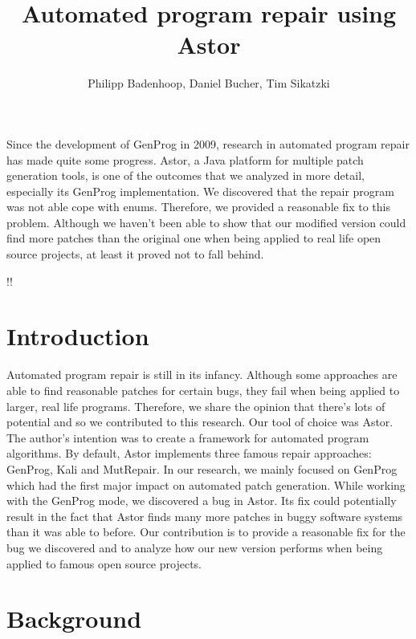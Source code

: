 \documentclass[pdftex,english,oribibl]{llncs}
\title{Automated program repair using Astor}
\author{Philipp Badenhoop, Daniel Bucher, Tim Sikatzki}
\institute{Humboldt University of Berlin\\Department of Computer Science\\12489 Berlin, Germany}
\makeatletter
\gdef\@keywords{}
\renewenvironment{abstract}{%
  \list{}{\advance\topsep by0.35cm\relax\small%
          \leftmargin=1cm%
          \labelwidth=\z@%
          \listparindent=\z@%
          \itemindent\listparindent%
          \rightmargin\leftmargin}%
          \item[\hskip\labelsep\bfseries\abstractname]}{%
  \if!\@keywords!\else{\item[~]\item[\hskip\labelsep\bfseries\keywordname]\@keywords}\fi%
  \endlist}
\makeatother
\begin{document}
\maketitle

\begin{abstract}
Since the development of GenProg in 2009, research in automated program repair has made quite some progress. Astor, a Java platform for multiple patch generation tools, is one of the outcomes that we analyzed in more detail, especially its GenProg implementation. 
We discovered that the repair program was not able cope with enums.
Therefore, we provided a reasonable fix to this problem. Although we haven't been able to show that our modified version could find more patches than the original one when being applied to real life open source projects, at least it proved not to fall behind.

\end{abstract}

\section{Introduction}
Automated program repair is still in its infancy.
Although some approaches are able to find reasonable patches for certain bugs, they fail when being applied to larger, real life programs.
Therefore, we share the opinion that there's lots of potential and so we contributed to this research.
Our tool of choice was Astor.
The author's intention was to create a framework for automated program algorithms.
By default, Astor implements three famous repair approaches: GenProg, Kali and MutRepair.
In our research, we mainly focused on GenProg which had the first major impact on automated patch generation.
While working with the GenProg mode, we discovered a bug in Astor. 
Its fix could potentially result in the fact that Astor finds many more patches in buggy software systems than it was able to before.
Our contribution is to provide a reasonable fix for the bug we discovered and to analyze how our new version performs when being applied to famous open source projects.

\section{Background}\label{sec:background}
\end{document}
